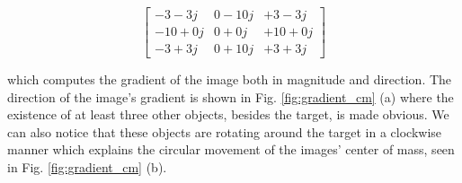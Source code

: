 \documentclass{aa}
\begin{document}
\begin{equation}
\begin{bmatrix}

-3-3j  & 0-10j &  +3 -3j \\
-10+0j & 0+ 0j & +10 +0j \\
-3+3j  & 0+10j &  +3 +3j

\end{bmatrix}
\end{equation}

which computes the gradient of the image both in magnitude and direction. The direction of the image's gradient is shown in Fig. \ref{fig:gradient_cm} (a) where the existence of at least three other objects, besides the target, is made obvious. We can also notice that these objects are rotating around the target in a clockwise manner which explains the circular movement of the images' center of mass, seen in Fig. \ref{fig:gradient_cm} (b).
\end{document}
